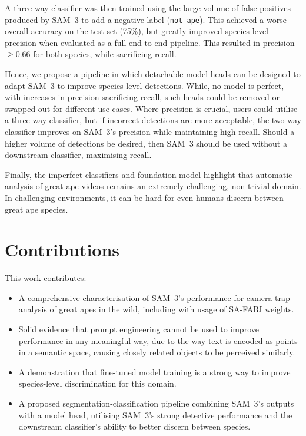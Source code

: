 \documentclass[author={Jacob Stephenson},
    degree={BSc},
    title={Robust Great Ape Species Detection in Wild Camera Trap Imagery with Promptable Concept Segmentation},
    unit={COMS30045},
    subtitle={}]{dissertation}
\begin{document}
A three-way classifier was then trained using the large volume of false positives produced by SAM~3 to add a negative label (\texttt{not-ape}). This achieved a worse overall accuracy on the test set (75\%), but greatly improved species-level precision when evaluated as a full end-to-end pipeline. This resulted in precision $\geq0.66$ for both species, while sacrificing recall.

Hence, we propose a pipeline in which detachable model heads can be designed to adapt SAM~3 to improve species-level detections. While, no model is perfect, with increases in precision sacrificing recall, such heads could be removed or swapped out for different use cases. Where precision is crucial, users could utilise a three-way classifier, but if incorrect detections are more acceptable, the two-way classifier improves on SAM~3's precision while maintaining high recall. Should a higher volume of detections be desired, then SAM~3 should be used without a downstream classifier, maximising recall.

Finally, the imperfect classifiers and foundation model highlight that automatic analysis of great ape videos remains an extremely challenging, non-trivial domain. In challenging environments, it can be hard for even humans discern between great ape species.


\section{Contributions}

This work contributes:
\begin{itemize}
    \item A comprehensive characterisation of SAM~3's performance for camera trap analysis of great apes in the wild, including with usage of SA-FARI weights.
    \item Solid evidence that prompt engineering cannot be used to improve performance in any meaningful way, due to the way text is encoded as points in a semantic space, causing closely related objects to be perceived similarly.
    \item A demonstration that fine-tuned model training is a strong way to improve species-level discrimination for this domain.
    \item A proposed segmentation-classification pipeline combining SAM~3's outputs with a model head, utilising SAM~3's strong detective performance and the downstream classifier's ability to better discern between species.
\end{itemize}
\end{document}
